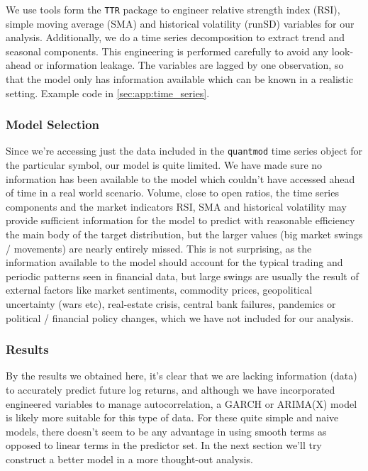 \documentclass[12pt, twoside,hidelinks]{article}
\theoremstyle{definition}
\numberwithin{equation}{section}
\begin{document}
We use tools form the \texttt{TTR} package to engineer relative strength index (RSI), simple moving average (SMA) and historical volatility (runSD) variables for our analysis. Additionally, we do a time series decomposition to extract trend and seasonal components. This engineering is performed carefully to avoid any look-ahead or information leakage. The variables are lagged by one observation, so that the model only has information available which can be known in a realistic setting. Example code in \ref{sec:app:time_series}.


\subsubsection{Model Selection}

Since we're accessing just the data included in the \texttt{quantmod} time series object for the particular symbol, our model is quite limited. We have made sure no information has been available to the model which couldn't have accessed ahead of time in a real world scenario. Volume, close to open ratios, the time series components and the market indicators RSI, SMA and historical volatility may provide sufficient information for the model to predict with reasonable efficiency the main body of the target distribution, but the larger values (big market swings / movements) are nearly entirely missed. This is not surprising, as the information available to the model should account for the typical trading and periodic patterns seen in financial data, but large swings are usually the result of external factors like market sentiments, commodity prices, geopolitical uncertainty (wars etc), real-estate crisis, central bank failures, pandemics or political / financial policy changes, which we have not included for our analysis. 

\subsubsection{Results}

By the results we obtained here, it's clear that we are lacking information (data) to accurately predict future log returns, and although we have incorporated engineered variables to manage autocorrelation, a GARCH or ARIMA(X) model is likely more suitable for this type of data. For these quite simple and naive models, there doesn't seem to be any advantage in using smooth terms as opposed to linear terms in the predictor set. In the next section we'll try construct a better model in a more thought-out analysis. 
\end{document}
